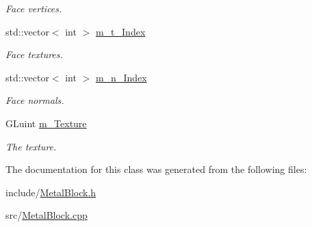 \begin{DoxyCompactItemize}
\begin{DoxyCompactList}\small\item\em Face vertices. \end{DoxyCompactList}\item 
\hypertarget{classMetalBlock_a014dcfc083e1114479d3b88d438426be}{std\-::vector$<$ int $>$ \hyperlink{classMetalBlock_a014dcfc083e1114479d3b88d438426be}{m\-\_\-t\-\_\-\-Index}}\label{classMetalBlock_a014dcfc083e1114479d3b88d438426be}

\begin{DoxyCompactList}\small\item\em Face textures. \end{DoxyCompactList}\item 
\hypertarget{classMetalBlock_a72513b07b5d159bc050f1c5052859eea}{std\-::vector$<$ int $>$ \hyperlink{classMetalBlock_a72513b07b5d159bc050f1c5052859eea}{m\-\_\-n\-\_\-\-Index}}\label{classMetalBlock_a72513b07b5d159bc050f1c5052859eea}

\begin{DoxyCompactList}\small\item\em Face normals. \end{DoxyCompactList}\item 
\hypertarget{classMetalBlock_a2f8ed158f38ba78762c50981771190dd}{G\-Luint \hyperlink{classMetalBlock_a2f8ed158f38ba78762c50981771190dd}{m\-\_\-\-Texture}}\label{classMetalBlock_a2f8ed158f38ba78762c50981771190dd}

\begin{DoxyCompactList}\small\item\em The texture. \end{DoxyCompactList}\end{DoxyCompactItemize}


The documentation for this class was generated from the following files\-:\begin{DoxyCompactItemize}
\item 
include/\hyperlink{MetalBlock_8h}{Metal\-Block.\-h}\item 
src/\hyperlink{MetalBlock_8cpp}{Metal\-Block.\-cpp}\end{DoxyCompactItemize}
